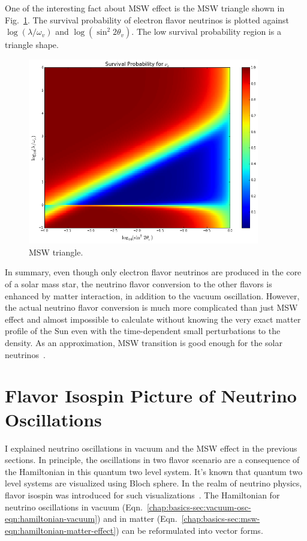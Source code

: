 One of the interesting fact about MSW effect is the MSW triangle shown in Fig.~\ref{chap:basics-sec:msw-fig:msw-triangle}. The survival probability of electron flavor neutrinos is plotted against $\log (\lambda/\omega_v)$ and $\log (\sin^2 2\theta_v)$. The low survival probability region is a triangle shape.
\begin{figure}
    \centering
    \includegraphics[width=0.9\textwidth]{chapters/assets/basics/msw-triangle.png}
    \caption{MSW triangle.}
    \label{chap:basics-sec:msw-fig:msw-triangle}
\end{figure}


In summary, even though only electron flavor neutrinos are produced in the core of a solar mass star, the neutrino flavor conversion to the other flavors is enhanced by matter interaction, in addition to the vacuum oscillation. However, the actual neutrino flavor conversion is much more complicated than just MSW effect and almost impossible to calculate without knowing the very exact matter profile of the Sun even with the time-dependent small perturbations to the density. As an approximation, MSW transition is good enough for the solar neutrinos~\cite{Lopes2013a}.


\section{\label{chap:basics-sec:flavor-isospin-pic}Flavor Isospin Picture of Neutrino Oscillations}

I explained neutrino oscillations in vacuum and the MSW effect in the previous sections. In principle, the oscillations in two flavor scenario are a consequence of the Hamiltonian in this quantum two level system. It's known that quantum two level systems are visualized using Bloch sphere. In the realm of neutrino physics, flavor isospin was introduced for such visualizations~\cite{Duan2006b}. The Hamiltonian for neutrino oscillations in vacuum (Eqn.~\ref{chap:basics-sec:vacuum-osc-eqn:hamiltonian-vacuum}) and in matter (Eqn.~\ref{chap:basics-sec:msw-eqn:hamiltonian-matter-effect}) can be reformulated into vector forms. 

